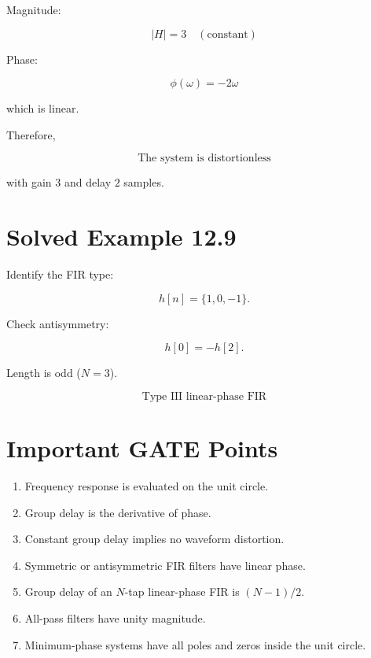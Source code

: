 Magnitude:

\[
|H|=3 \quad (\text{constant})
\]

Phase:

\[
\phi(\omega)=-2\omega
\]

which is linear.

Therefore,

\[
\boxed{
\text{The system is distortionless}
}
\]

with gain \(3\) and delay \(2\) samples.


\section{Solved Example 12.9}

Identify the FIR type:

\[
h[n]=\{1,0,-1\}.
\]

Check antisymmetry:

\[
h[0]=-h[2].
\]

Length is odd (\(N=3\)).

\[
\boxed{
\text{Type III linear-phase FIR}
}
\]


\section{Important GATE Points}

\begin{enumerate}
\item Frequency response is evaluated on the unit circle.
\item Group delay is the derivative of phase.
\item Constant group delay implies no waveform distortion.
\item Symmetric or antisymmetric FIR filters have linear phase.
\item Group delay of an \(N\)-tap linear-phase FIR is \((N-1)/2\).
\item All-pass filters have unity magnitude.
\item Minimum-phase systems have all poles and zeros inside the unit circle.
\end{enumerate}



